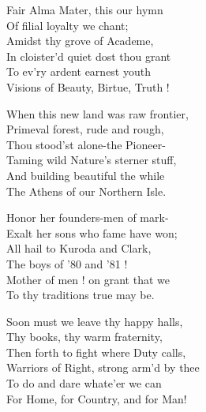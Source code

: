 \documentclass[10pt,b5j]{tarticle} %
\begin{document}
\vspace{1.5em} %
\newcommand{\linespace}{0.5em} %
\newcommand{\blocksize}{0.5\hsize} %
\begin{enumerate} %
    \begin{minipage}[c]{\blocksize}
    
        \vspace{\linespace}
        \item
        Fair Alma Mater, this our hymn\\
          Of filial loyalty we chant;\\
        Amidst thy grove of Academe,\\
          In cloister'd quiet dost thou grant\\
            To ev'ry ardent earnest youth\\
            Visions of Beauty, Birtue, Truth !
        
        \vspace{\linespace}
        \item
        When this new land was raw frontier,\\
          Primeval forest, rude and rough,\\
        Thou stood'st alone-the Pioneer-\\
          Taming wild Nature's sterner stuff,\\
            And building beautiful the while\\
            The Athens of our Northern Isle.
        
        \vspace{\linespace}
        \item
        Honor her founders-men of mark-\\
          Exalt her sons who fame have won;\\
        All hail to Kuroda and Clark,\\
          The boys of '80 and '81 !\\
            Mother of men ! on grant that we\\
            To thy traditions true may be.
        
        \vspace{\linespace}
        \item
        Soon must we leave thy happy halls,\\
          Thy books, thy warm fraternity,\\
        Then forth to fight where Duty calls,\\
          Warriors of Right, strong arm'd by thee\\
            To do and dare whate'er we can\\
            For Home, for Country, and for Man!
    
    \end{minipage}
\end{enumerate} %
\end{document}
